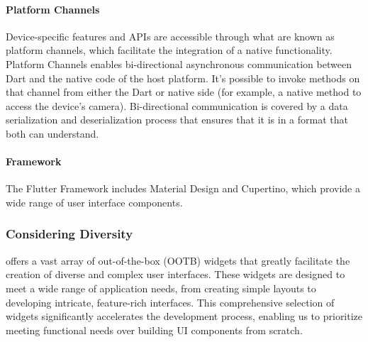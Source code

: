 \paragraph{Platform Channels} Device-specific features and APIs are accessible through what are known as platform channels, 
which facilitate the integration of a native functionality. Platform Channels enables bi-directional asynchronous 
communication between Dart and the native code of the host platform. It's possible to invoke methods on that channel 
from either the Dart or native side (for example, a native method to access the device's camera). Bi-directional 
communication is covered by a data serialization and deserialization process that ensures that it is in a format that 
both can understand.

\paragraph{Framework} The Flutter Framework includes Material Design and Cupertino, which provide a wide range of user 
interface components.


\subsubsection{Considering Diversity}

 offers a vast array of out-of-the-box (OOTB) widgets that greatly facilitate the creation of diverse and 
complex user interfaces. These widgets are designed to meet a wide range of application needs, from creating simple 
layouts to developing intricate, feature-rich interfaces. This comprehensive selection of widgets significantly 
accelerates the development process, enabling us to prioritize meeting functional needs over building UI components 
from scratch.

